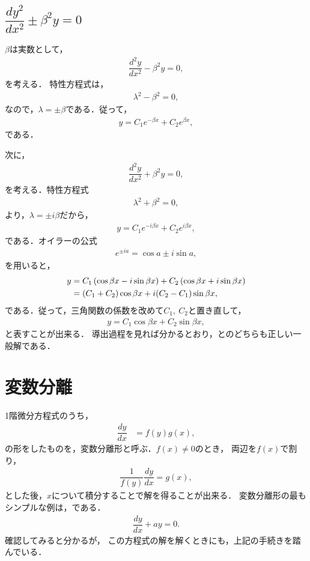 %
\subsection{$\dfrac{dy^2}{dx^2} \pm \beta^2 y =0$}
$\beta$は実数として，
\begin{align}
  \dfrac{d^2 y}{dx^2} - \beta^{2}y = 0, \label{eq:PDE_05_01}
\end{align}
を考える．
特性方程式は，
\begin{align}
  \lambda^2 -\beta^2 = 0,
\end{align}
なので，$\lambda = \pm \beta$である．従って，
\begin{align}
  y = C_{1} e^{-\beta x} + C_{2} e^{\beta x},
\end{align}
である．

次に，
\begin{align}
  \dfrac{d^2 y}{dx^2} + \beta^{2} y = 0, \label{eq:PDE_05_02}
\end{align}
を考える．特性方程式
\begin{align}
  \lambda^2 + \beta^2 = 0,
\end{align}
より，$\lambda = \pm i\beta$だから，
\begin{align}
  y = C_1 e^{-i\beta x} + C_{2} e^{i\beta x}, \label{eq:PDE_05_02_sol_01} 
\end{align}
である．オイラーの公式
\begin{align}
  e^{\pm i a} = \cos a \pm i\sin a, 
\end{align}
を用いると，
\begin{align}
  y & =  C_{1}\left(\cos \beta x - i \sin \beta x\right) 
       + C_{2}\left(\cos \beta x + i \sin \beta x\right) \notag \\
    & =  \left(C_1 + C_2 \right)\cos \beta x + i (C_2 - C_1) \sin \beta x,
\end{align}
である．従って，三角関数の係数を改めて$C_1,~C_2$と置き直して，
\begin{align}
  y = C_1 \cos \beta x + C_2 \sin \beta x, \label{eq:PDE_05_02_sol_02}
\end{align}
と表すことが出来る．
導出過程を見れば分かるとおり，とのどちらも正しい一般解である．
%
\section{変数分離}
%
1階微分方程式のうち，
\begin{align}
  \dfrac{dy}{dx} & =f\left(y\right)g\left(x\right),
\end{align}
の形をしたものを，変数分離形と呼ぶ．$f\left(x\right) \neq 0$のとき，
両辺を$f\left(x\right)$で割り，
\begin{align}
  \dfrac{1}{f\left(y\right)}\dfrac{dy}{dx} = g\left(x\right),
\end{align}
とした後，$x$について積分することで解を得ることが出来る．
変数分離形の最もシンプルな例は，である．
\begin{align}
 \dfrac{dy}{dx} + ay = 0. 
\end{align}
確認してみると分かるが，
この方程式の解を解くときにも，上記の手続きを踏んでいる．

